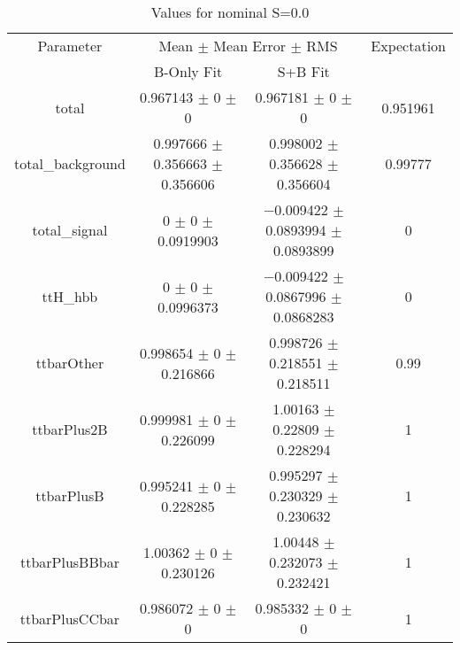 \begin{table}
\centering
\caption{Values for nominal S=0.0}
\begin{tabular}{cccc}
\toprule
Parameter & \multicolumn{2}{c}{Mean $\pm$ Mean Error $\pm$ RMS} & Expectation\\
 & B-Only Fit & S+B Fit & \\
\midrule
total & \num{0.967143} $\pm$ \num{0} $\pm$ \num{0} & \num{0.967181} $\pm$ \num{0} $\pm$ \num{0} & \num{0.951961}\\
total\_background & \num{0.997666} $\pm$ \num{0.356663} $\pm$ \num{0.356606} & \num{0.998002} $\pm$ \num{0.356628} $\pm$ \num{0.356604} & \num{0.99777}\\
total\_signal & \num{0} $\pm$ \num{0} $\pm$ \num{0.0919903} & \num{-0.009422} $\pm$ \num{0.0893994} $\pm$ \num{0.0893899} & \num{0}\\
ttH\_hbb & \num{0} $\pm$ \num{0} $\pm$ \num{0.0996373} & \num{-0.009422} $\pm$ \num{0.0867996} $\pm$ \num{0.0868283} & \num{0}\\
ttbarOther & \num{0.998654} $\pm$ \num{0} $\pm$ \num{0.216866} & \num{0.998726} $\pm$ \num{0.218551} $\pm$ \num{0.218511} & \num{0.99}\\
ttbarPlus2B & \num{0.999981} $\pm$ \num{0} $\pm$ \num{0.226099} & \num{1.00163} $\pm$ \num{0.22809} $\pm$ \num{0.228294} & \num{1}\\
ttbarPlusB & \num{0.995241} $\pm$ \num{0} $\pm$ \num{0.228285} & \num{0.995297} $\pm$ \num{0.230329} $\pm$ \num{0.230632} & \num{1}\\
ttbarPlusBBbar & \num{1.00362} $\pm$ \num{0} $\pm$ \num{0.230126} & \num{1.00448} $\pm$ \num{0.232073} $\pm$ \num{0.232421} & \num{1}\\
ttbarPlusCCbar & \num{0.986072} $\pm$ \num{0} $\pm$ \num{0} & \num{0.985332} $\pm$ \num{0} $\pm$ \num{0} & \num{1}\\
\bottomrule
\end{tabular}
\end{table}